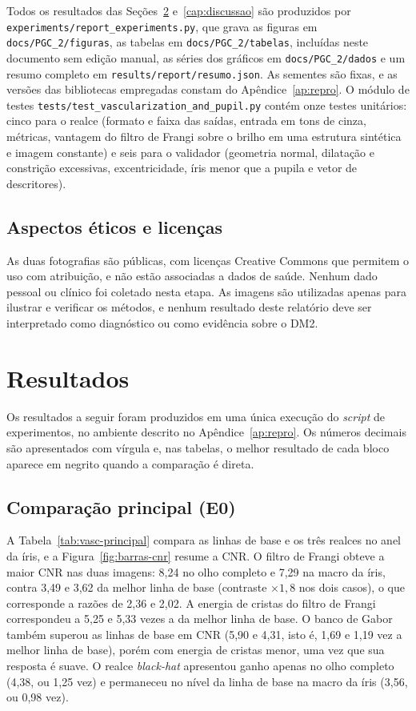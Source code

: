 \documentclass[12pt, oneside, a4paper, chapter=TITLE, section=TITLE,
               english, brazil]{abntex2}
\newcommand{\secao}[1]{\section[\texorpdfstring{\protect\MakeTextUppercase{#1}}{#1}]{#1}}
\newcommand{\bh}{\emph{black-hat}}
\newcommand{\arq}[1]{\nolinkurl{#1}}
\begin{document}
Todos os resultados das Seções~\ref{cap:resultados} e~\ref{cap:discussao} são
produzidos por \arq{experiments/report_experiments.py}, que grava as figuras
em \arq{docs/PGC_2/figuras}, as tabelas em \arq{docs/PGC_2/tabelas},
incluídas neste documento sem edição manual, as séries dos gráficos em
\arq{docs/PGC_2/dados} e um resumo completo em
\arq{results/report/resumo.json}. As sementes são fixas, e as versões das
bibliotecas empregadas
\citep*{Bradski2000,Harris2020,Hunter2007,Pedregosa2011,vanderWalt2014,Virtanen2020}
constam do Apêndice~\ref{ap:repro}. O módulo de testes
\arq{tests/test_vascularization_and_pupil.py} contém onze testes unitários:
cinco para o realce (formato e faixa das saídas, entrada em tons de cinza,
métricas, vantagem do filtro de Frangi sobre o brilho em uma estrutura
sintética e imagem constante) e seis para o validador (geometria normal,
dilatação e constrição excessivas, excentricidade, íris menor que a pupila e
vetor de descritores).

\secao{Aspectos éticos e licenças}

As duas fotografias são públicas, com licenças Creative Commons que permitem
o uso com atribuição, e não estão associadas a dados de saúde. Nenhum dado
pessoal ou clínico foi coletado nesta etapa. As imagens são utilizadas apenas
para ilustrar e verificar os métodos, e nenhum resultado deste relatório deve
ser interpretado como diagnóstico ou como evidência sobre o DM2.

\chapter{Resultados}
\label{cap:resultados}

Os resultados a seguir foram produzidos em uma única execução do
\emph{script} de experimentos, no ambiente descrito no
Apêndice~\ref{ap:repro}. Os números decimais são apresentados com vírgula e,
nas tabelas, o melhor resultado de cada bloco aparece em negrito quando a
comparação é direta.

\secao{Comparação principal (E0)}
\label{sec:res-principal}

A Tabela~\ref{tab:vasc-principal} compara as linhas de base e os três realces
no anel da íris, e a Figura~\ref{fig:barras-cnr} resume a CNR. O filtro de
Frangi obteve a maior CNR nas duas imagens: 8,24 no olho completo e 7,29 na
macro da íris, contra 3,49 e 3,62 da melhor linha de base (contraste
$\times 1{,}8$ nos dois casos), o que corresponde a razões de 2,36 e 2,02. A
energia de cristas do filtro de Frangi correspondeu a 5,25 e 5,33 vezes a da
melhor linha de base. O banco de Gabor também superou as linhas de base em
CNR (5,90 e 4,31, isto é, 1,69 e 1,19 vez a melhor linha de base), porém com
energia de cristas menor, uma vez que sua resposta é suave. O realce \bh{}
apresentou ganho apenas no olho completo (4,38, ou 1,25 vez) e permaneceu no
nível da linha de base na macro da íris (3,56, ou 0,98 vez).
\end{document}
